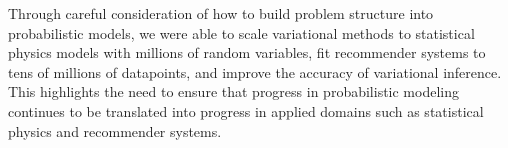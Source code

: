 Through careful consideration of how to build problem structure into probabilistic models, we were able to scale variational methods to statistical physics models with millions of random variables, fit recommender systems to tens of millions of datapoints, and improve the accuracy of variational inference. This highlights the need to ensure that progress in probabilistic modeling continues to be translated into progress in applied domains such as statistical physics and recommender systems.